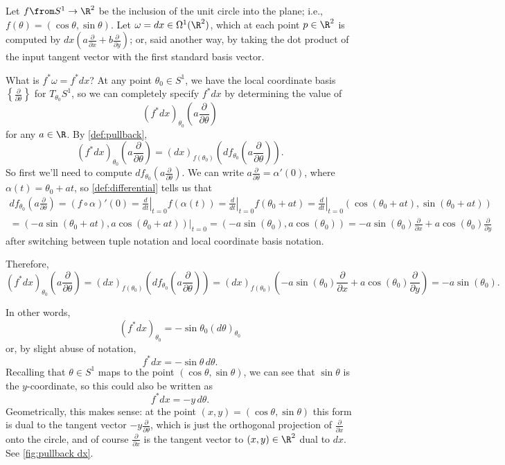 \begin{example}
	Let $f \from S^1 \to \R^2$ be the inclusion of the unit circle into the plane; i.e., $f(\theta) = (\cos \theta , \sin \theta)$. Let $\omega = dx \in \Omega^1(\R^2)$, which at each point $p \in \R^2$ is computed by $dx\left(a \frac{\partial}{\partial x} + b \frac{\partial}{\partial y}\right)$; or, said another way, by taking the dot product of the input tangent vector with the first standard basis vector.
	
	What is $f^\ast \omega = f^\ast dx$? At any point $\theta_0 \in S^1$, we have the local coordinate basis $\left\{ \frac{\partial}{\partial \theta}\right\}$ for $T_{\theta_0}S^1$, so we can completely specify $f^\ast dx$ by determining the value of
	\[
		(f^\ast dx)_{\theta_0}\left( a \frac{\partial}{\partial \theta}\right)
	\]
	for any $a \in \R$. By \cref{def:pullback},
	\[
		(f^\ast dx)_{\theta_0}\left( a \frac{\partial}{\partial \theta}\right) = (dx)_{f(\theta_0)}\left(df_{\theta_0}\left( a \frac{\partial}{\partial \theta}\right)\right).
	\]
	So first we'll need to compute $df_{\theta_0}\left( a \frac{\partial}{\partial \theta}\right)$. We can write $a \frac{\partial}{\partial \theta} = \alpha'(0)$, where $\alpha(t) = \theta_0 + a t$, so \cref{def:differential} tells us that
	\begin{multline*}
		df_{\theta_0}\left( a \frac{\partial}{\partial \theta}\right) = (f \circ \alpha)'(0) = \left. \frac{d}{dt} \right|_{t=0} f(\alpha(t)) = \left. \frac{d}{dt} \right|_{t=0} f(\theta_0 + at) = \left. \frac{d}{dt} \right|_{t=0} (\cos(\theta_0 + at), \sin(\theta_0 + at)) \\
		= \left. (-a\sin(\theta_0 + at),a \cos(\theta_0 + at))\right|_{t=0} = (-a \sin(\theta_0), a \cos(\theta_0)) = -a \sin(\theta_0) \frac{\partial}{\partial x} + a \cos(\theta_0) \frac{\partial}{\partial y}
	\end{multline*}
	after switching between tuple notation and local coordinate basis notation. 
	
	Therefore,
	\[
		(f^\ast dx)_{\theta_0}\left( a \frac{\partial}{\partial \theta}\right) = (dx)_{f(\theta_0)}\left(df_{\theta_0}\left( a \frac{\partial}{\partial \theta}\right)\right) = (dx)_{f(\theta_0)}\left(-a \sin(\theta_0) \frac{\partial}{\partial x} + a \cos(\theta_0) \frac{\partial}{\partial y}\right) = -a \sin(\theta_0).
	\]
	
	In other words,
	\[
		(f^\ast dx)_{\theta_0} = -\sin\theta_0 (d\theta)_{\theta_0}
	\]
	or, by slight abuse of notation,
	\[
		f^\ast dx = -\sin \theta \, d\theta.
	\]
	Recalling that $\theta \in S^1$ maps to the point $(\cos \theta, \sin \theta)$, we can see that $\sin \theta$ is the $y$-coordinate, so this could also be written as
	\[
		f^\ast dx = -y \, d\theta.
	\]
	Geometrically, this makes sense: at the point $(x,y) = (\cos \theta, \sin \theta)$ this form is dual to the tangent vector $-y \frac{\partial}{\partial \theta}$, which is just the orthogonal projection of $\frac{\partial}{\partial x}$ onto the circle, and of course $\frac{\partial}{\partial x}$ is the tangent vector to $(x,y) \in \R^2$ dual to $dx$. See \cref{fig:pullback dx}.
	

\end{example}

